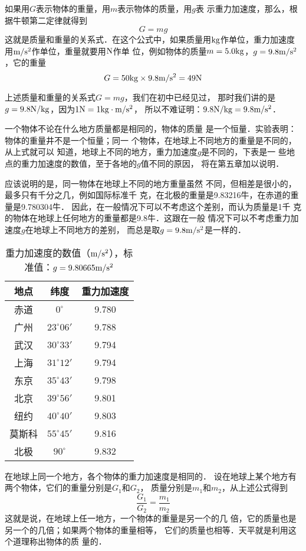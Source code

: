 如果用$G$表示物体的重量，用$m$表示物体的质量，用$g$表
示重力加速度，那么，根据牛顿第二定律就得到
\[ G=mg\]
这就是质量和重量的关系式．在这个公式中，如果质量用${\rm kg}$作单位，重力加速度用$\text{m}/\text{s}^2$作单位，重量就要用${\rm N}$作单
位，例如物体的质量$m=5.0{\rm kg}$，$g=9.8\text{m}/\text{s}^2$，它的重量
\[G=50{\rm kg}\times 9.8\text{m}/\text{s}^2=49{\rm N}\]

上述质量和重量的关系式$G=mg$，我们在初中已经见过，
那时我们讲的是$g=9.8{\rm N/kg}$，因为$1{\rm N}=1{\rm kg}\cdot \text{m}/\text{s}^2$，
所以不难证明：$9.8{\rm N/kg}=9.8\text{m}/\text{s}^2$．


一个物体不论在什么地方质量都是相同的，物体的质量
是一个恒量．实验表明：物体的重量井不是一个恒量；同一
个物体，在地球上不同地方的重量是不同的，从上式就可以
知道，地球上不同的地方，重力加速度$g$是不同的，下表是一
些地点的重力加速度的数值，至于各地的$g$值不同的原因，
将在第五章加以说明．

应该说明的是，同一物体在地球上不同的地方重量虽然
不同，但相差是很小的，最多只有千分之几，例如国际标准千
克，在北极的重量是9.83216牛，在赤道的重量是9.780304牛．
因此，在一般情况下可以不考虑这个差别，而认为质量是1千
克的物体在地球上任何地方的重量都是9.8牛．这跟在一般
情况下可以不考虑重力加速度$g$在地球上不同地方的差别，
而总是取$g=9.8\text{m}/\text{s}^2$是一样的．

\begin{table}[htp]\centering
\caption{重力加速度的数值（$\text{m}/\text{s}^2$），标准值：$g=9.80665\text{m}/\text{s}^2$
}
\begin{tabular}{ccc}
\hline
地点  &  纬度  &  重力加速度\\
\hline
赤道   & $0^\circ$   &  9.780\\
广州  &  $23^\circ 06'$  &  9.788\\
武汉  &  $30^\circ 33'$  &  9.794\\
上海  &  $31^\circ 12'$  & 9.794 \\
东京  & $35^\circ 43'$   & 9.798 \\
北京  &  $39^\circ 56'$  & 9.801 \\
纽约  & $40^\circ 40'$   & 9.803 \\
莫斯科  &$55^\circ 45'$    & 9.816 \\
北极  & $90^\circ$   & 9.832 \\
\hline
\end{tabular}

\end{table}

在地球上同一个地方，各个物体的重力加速度是相同的．
设在地球上某个地方有两个物体，它们的重量分别是$G_1$和$G_2$，
质量分别是$m_1$和$m_2$，从上述公式得到
\[\frac{G_1}{G_2}=\frac{m_1}{m_2} \]
这就是说，在地球上任一地方，一个物体的重量是另一个的几
倍，它的质量也是另一个的几倍；如果两个物体的重量相等，
它们的质量也相等．天平就是利用这个道理称出物体的质
量的．


